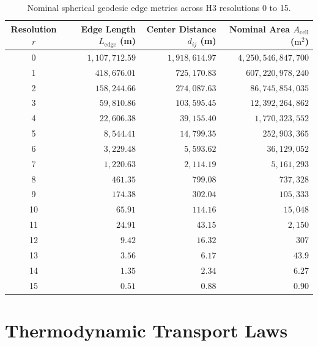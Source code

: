 \documentclass[11pt,a4paper]{article}
\begin{document}
\begin{table}[htbp]
\centering
\small
\caption{Nominal spherical geodesic edge metrics across H3 resolutions 0 to 15.}
\label{tab:h3_metrics}
\begin{tabular}{crrr}
\toprule
\textbf{Resolution $r$} & \textbf{Edge Length $L_{\text{edge}}$ (m)} & \textbf{Center Distance $d_{ij}$ (m)} & \textbf{Nominal Area $A_{\text{cell}}$ ($\text{m}^2$)} \\
\midrule
0  & $1{,}107{,}712.59$ & $1{,}918{,}614.97$ & $4{,}250{,}546{,}847{,}700$ \\
1  & $418{,}676.01$     & $725{,}170.83$     & $607{,}220{,}978{,}240$   \\
2  & $158{,}244.66$     & $274{,}087.63$     & $86{,}745{,}854{,}035$    \\
3  & $59{,}810.86$      & $103{,}595.45$     & $12{,}392{,}264{,}862$    \\
4  & $22{,}606.38$      & $39{,}155.40$      & $1{,}770{,}323{,}552$     \\
5  & $8{,}544.41$       & $14{,}799.35$      & $252{,}903{,}365$         \\
6  & $3{,}229.48$       & $5{,}593.62$       & $36{,}129{,}052$          \\
7  & $1{,}220.63$       & $2{,}114.19$       & $5{,}161{,}293$           \\
8  & $461.35$           & $799.08$           & $737{,}328$               \\
9  & $174.38$           & $302.04$           & $105{,}333$               \\
10 & $65.91$            & $114.16$           & $15{,}048$                \\
11 & $24.91$            & $43.15$            & $2{,}150$                 \\
12 & $9.42$             & $16.32$            & $307$                     \\
13 & $3.56$             & $6.17$             & $43.9$                    \\
14 & $1.35$             & $2.34$             & $6.27$                    \\
15 & $0.51$             & $0.88$             & $0.90$                    \\
\bottomrule
\end{tabular}
\end{table}

\section{Thermodynamic Transport Laws}
\end{document}

